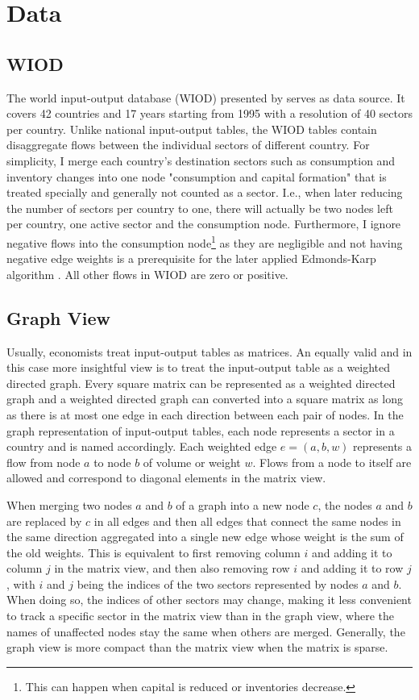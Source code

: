 \documentclass{paper}
\begin{document}
\section{Data}
\label{sec:data}
\subsection{WIOD}
The world input-output database (WIOD) presented by \cite{timmer2012world} serves as data source. It covers 42 countries and 17 years starting from 1995 with a resolution of 40 sectors per country. Unlike national input-output tables, the WIOD tables contain disaggregate flows between the individual sectors of different country. For simplicity, I merge each country's destination sectors such as consumption and inventory changes into one node "consumption and capital formation" that is treated specially and generally not counted as a sector. I.e., when later reducing the number of sectors per country to one, there will actually be two nodes left per country, one active sector and the consumption node. Furthermore, I ignore negative flows into the consumption node\footnote{This can happen when capital is reduced or inventories decrease.} as they are negligible and not having negative edge weights is a prerequisite for the later applied Edmonds-Karp algorithm \cite{edmonds1972theoretical}. All other flows in WIOD are zero or positive.

\subsection{Graph View}
\label{sec:graphview}
Usually, economists treat input-output tables as matrices. An equally valid and in this case more insightful view is to treat the input-output table as a weighted directed graph. Every square matrix can be represented as a weighted directed graph and a weighted directed graph can converted into a square matrix as long as there is at most one edge in each direction between each pair of nodes. In the graph representation of input-output tables, each node represents a sector in a country and is named accordingly. Each weighted edge $e=(a, b, w)$ represents a flow from node $a$ to node $b$ of volume or weight $w$. Flows from a node to itself are allowed and correspond to diagonal elements in the matrix view.

When merging two nodes $a$ and $b$ of a graph into a new node $c$, the nodes $a$ and $b$ are replaced by $c$ in all edges and then all edges that connect the same nodes in the same direction aggregated into a single new edge whose weight is the sum of the old weights. This is equivalent to first removing column $i$ and adding it to column $j$ in the matrix view, and then also removing row $i$ and adding it to row $j$, with $i$ and $j$ being the indices of the two sectors represented by nodes $a$ and $b$. When doing so, the indices of other sectors may change, making it less convenient to track a specific sector in the matrix view than in the graph view, where the names of unaffected nodes stay the same when others are merged. Generally, the graph view is more compact than the matrix view when the matrix is sparse.
\end{document}

